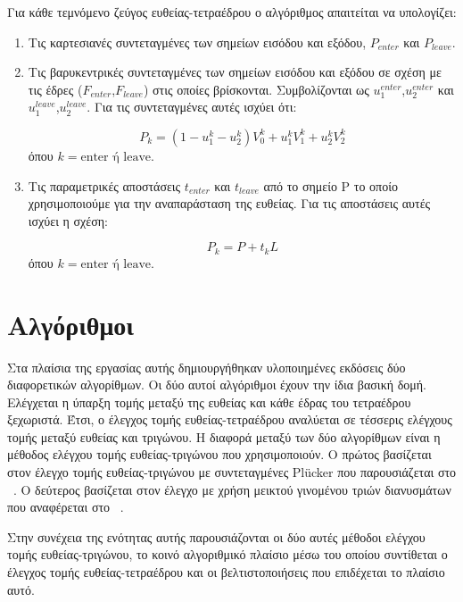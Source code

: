 Για κάθε τεμνόμενο ζεύγος ευθείας-τετραέδρου ο αλγόριθμος απαιτείται να υπολογίζει:

\begin{enumerate}
\item Τις καρτεσιανές συντεταγμένες των σημείων εισόδου και εξόδου, $P_{enter}$ και $P_{leave}$.  

\item Τις βαρυκεντρικές συντεταγμένες των σημείων εισόδου και εξόδου σε σχέση με τις έδρες ($F_{enter}$,$F_{leave}$) στις οποίες βρίσκονται. Συμβολίζονται ως $u^{enter}_1$,$u^{enter}_2$ και $u^{leave}_1$,$u^{leave}_2$. Για τις συντεταγμένες αυτές ισχύει ότι:

\begin{equation*}
P_k = (1 - u^k_1 - u^k_2)V^k_0 + u^k_1 V^k_1 + u^k_2 V^k_2
\end{equation*}
όπου $k= \text{enter} \text{ ή } \text{leave}$.
	
\item Τις παραμετρικές αποστάσεις $t_{enter}$ και $t_{leave}$ από το σημείο P το οποίο χρησιμοποιούμε για την αναπαράσταση της ευθείας. Για τις αποστάσεις αυτές ισχύει η σχέση:

\begin{equation*}
P_k = P +t_k L
\end{equation*}
όπου $k= \text{enter} \text{ ή } \text{leave}$.
\end{enumerate}
\pagebreak
\section{Αλγόριθμοι}
\label{chapter:algs_general}
\noindent  Στα πλαίσια της εργασίας αυτής δημιουργήθηκαν υλοποιημένες εκδόσεις δύο διαφορετικών αλγορίθμων. Οι δύο αυτοί αλγόριθμοι έχουν την ίδια βασική δομή. Ελέγχεται η ύπαρξη τομής μεταξύ της ευθείας και κάθε έδρας του τετραέδρου ξεχωριστά. Έτσι, ο έλεγχος τομής ευθείας-τετραέδρου αναλύεται σε τέσσερις ελέγχους τομής μεταξύ ευθείας και τριγώνου. Η διαφορά μεταξύ των δύο αλγορίθμων είναι η μέθοδος ελέγχου τομής ευθείας-τριγώνου που χρησιμοποιούν. Ο πρώτος βασίζεται στον έλεγχο τομής ευθείας-τριγώνου με συντεταγμένες Plücker που παρουσιάζεται στο ~\cite{PlatisTheoharis03}. Ο δεύτερος βασίζεται στον έλεγχο με χρήση μεικτού γινομένου τριών διανυσμάτων που αναφέρεται στο ~\cite{ericson2005real}.

Στην συνέχεια της ενότητας αυτής παρουσιάζονται οι δύο αυτές μέθοδοι ελέγχου τομής ευθείας-τριγώνου, το κοινό αλγοριθμικό πλαίσιο μέσω του οποίου συντίθεται ο έλεγχος τομής ευθείας-τετραέδρου και οι βελτιστοποιήσεις που επιδέχεται το πλαίσιο αυτό. 

